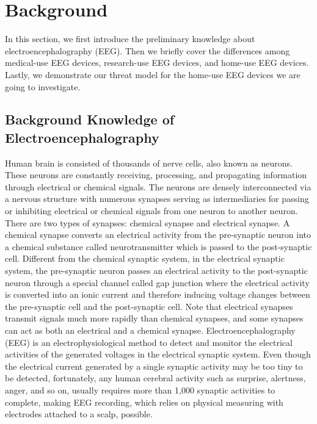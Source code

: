 \section{Background}
\label{sec:background}

In this section, we first introduce the preliminary knowledge about electroencephalography (EEG). Then we briefly cover the differences among medical-use EEG devices, research-use EEG devices, and home-use EEG devices. Lastly, we demonstrate our threat model for the home-use EEG devices we are going to investigate. 

\subsection{Background Knowledge of Electroencephalography}
Human brain is consisted of thousands of nerve cells, also known as neurons. These neurons are constantly receiving, processing, and propagating information through electrical or chemical signals. The neurons are densely interconnected via a nervous structure with numerous synapses serving as intermediaries for passing or inhibiting electrical or chemical signals from one neuron to another neuron. There are two types of synapses: chemical synapse and electrical synapse. A chemical synapse converts an electrical activity from the pre-synaptic neuron into a chemical substance called neurotransmitter which is passed to the post-synaptic cell. Different from the chemical synaptic system, in the electrical synaptic system, the pre-synaptic neuron passes an electrical activity to the post-synaptic neuron through a special channel called gap junction where the electrical activity is converted into an ionic current and therefore inducing voltage changes between the pre-synaptic cell and the post-synaptic cell. Note that electrical synapses transmit signals much more rapidly than chemical synapses, and some synapses can act as both an electrical and a chemical synapse. Electroencephalography (EEG) is an electrophysiological method to detect and monitor the electrical activities of the generated voltages in the electrical synaptic system. Even though the electrical current generated by a single synaptic activity may be too tiny to be detected, fortunately, any human cerebral activity such as surprise, alertness, anger, and so on, usually requires more than 1,000 synaptic activities to complete, making EEG recording, which relies on physical measuring with electrodes attached to a scalp, possible. \\
